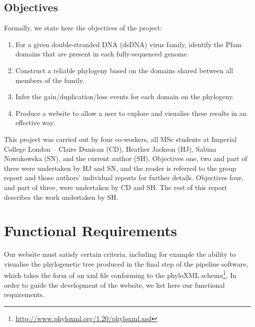 \documentclass[12pt,a4paper]{article}
\begin{document}
\subsection{Objectives}
\label{sec:objectives}
Formally, we state here the objectives of the project:
\begin{enumerate}
\item For a given double-stranded DNA (dsDNA) virus family, identify the Pfam domains that are present in each fully-sequenced genome.
\item Construct a reliable phylogeny based on the domains shared between all members of the family.
\item Infer the gain/duplication/loss events for each domain on the phylogeny.
\item Produce a website to allow a user to explore and visualise these results in an effective way.
\end{enumerate}

This project was carried out by four co-workers, all MSc students at Imperial College London -- Claire Dunican (CD), Heather Jackson (HJ), Sabina Nowakowska (SN), and the current author (SH). Objectives one, two and part of three were undertaken by HJ and SN, and the reader is referred to the group report and those authors' individual reports for further details. Objectives four, and part of three, were undertaken by CD and SH. The rest of this report describes the work undertaken by SH.

\section{Functional Requirements}
\label{sec:reqs}
Our website must satisfy certain criteria, including for example the ability to visualise the phylogenetic tree produced in the final step of the pipeline software, which takes the form of an xml file conforming to the phyloXML schema\footnote{\url{http://www.phyloxml.org/1.20/phyloxml.xsd}}. In order to guide the development of the website, we list here our functional requirements.
\end{document}
